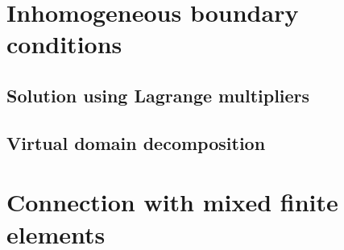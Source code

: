 \section{Inhomogeneous boundary conditions}\label{sec:mixedbc}

\subsection{Solution using Lagrange multipliers}

\subsection{Virtual domain decomposition}


\section{Connection with mixed finite elements}





